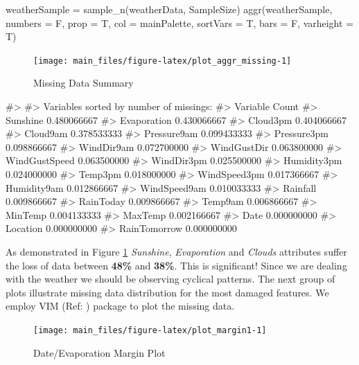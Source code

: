 \begin{Schunk}
\begin{Sinput}
weatherSample = sample_n(weatherData, SampleSize)
aggr(weatherSample, numbers = F, prop = T, col = mainPalette, sortVars = T, bars = F, varheight = T)
\end{Sinput}
\begin{figure}[H]

{\centering \texttt{[image: main\_files/figure-latex/plot\_aggr\_missing-1]} 

}

\caption[Missing Data Summary]{Missing Data Summary}\label{fig:plot_aggr_missing}
\end{figure}
\begin{Soutput}
#> 
#>  Variables sorted by number of missings: 
#>       Variable       Count
#>       Sunshine 0.480066667
#>    Evaporation 0.430066667
#>       Cloud3pm 0.404066667
#>       Cloud9am 0.378533333
#>    Pressure9am 0.099433333
#>    Pressure3pm 0.098866667
#>     WindDir9am 0.072700000
#>    WindGustDir 0.063800000
#>  WindGustSpeed 0.063500000
#>     WindDir3pm 0.025500000
#>    Humidity3pm 0.024000000
#>        Temp3pm 0.018000000
#>   WindSpeed3pm 0.017366667
#>    Humidity9am 0.012866667
#>   WindSpeed9am 0.010033333
#>       Rainfall 0.009866667
#>      RainToday 0.009866667
#>        Temp9am 0.006866667
#>        MinTemp 0.004133333
#>        MaxTemp 0.002166667
#>           Date 0.000000000
#>       Location 0.000000000
#>   RainTomorrow 0.000000000
\end{Soutput}
\end{Schunk}

As demonstrated in Figure \ref{fig:plot_aggr_missing} \emph{Sunshine},
\emph{Evaporation} and \emph{Clouds} attributes suffer the loss of data
between \textbf{48\%} and \textbf{38\%}. This is significant! Since we
are dealing with the weather we should be observing cyclical patterns.
The next group of plots illustrate missing data distribution for the
most damaged features. We employ VIM (Ref: \cite{vim}) package to plot
the missing data.

\begin{Schunk}
\begin{figure}[H]

{\centering \texttt{[image: main\_files/figure-latex/plot\_margin1-1]} 

}

\caption[Date/Evaporation Margin Plot]{Date/Evaporation Margin Plot}\label{fig:plot_margin1}
\end{figure}
\end{Schunk}

